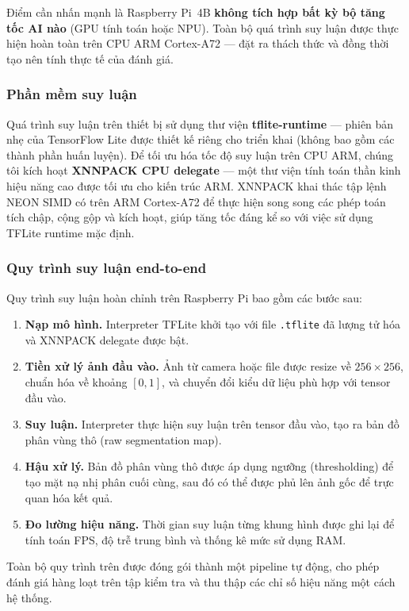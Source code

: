 \documentclass[conference]{IEEEtran}
\begin{document}
Điểm cần nhấn mạnh là Raspberry Pi~4B \textbf{không tích hợp bất kỳ bộ tăng tốc AI nào} (GPU tính toán hoặc NPU). Toàn bộ quá trình suy luận được thực hiện hoàn toàn trên CPU ARM Cortex-A72 --- đặt ra thách thức và đồng thời tạo nên tính thực tế của đánh giá.

\subsubsection{Phần mềm suy luận}

Quá trình suy luận trên thiết bị sử dụng thư viện \textbf{tflite-runtime} --- phiên bản nhẹ của TensorFlow Lite được thiết kế riêng cho triển khai (không bao gồm các thành phần huấn luyện). Để tối ưu hóa tốc độ suy luận trên CPU ARM, chúng tôi kích hoạt \textbf{XNNPACK CPU delegate} --- một thư viện tính toán thần kinh hiệu năng cao được tối ưu cho kiến trúc ARM. XNNPACK khai thác tập lệnh NEON SIMD có trên ARM Cortex-A72 để thực hiện song song các phép toán tích chập, cộng gộp và kích hoạt, giúp tăng tốc đáng kể so với việc sử dụng TFLite runtime mặc định.

\subsubsection{Quy trình suy luận end-to-end}

Quy trình suy luận hoàn chỉnh trên Raspberry Pi bao gồm các bước sau:
\begin{enumerate}
  \item \textbf{Nạp mô hình.} Interpreter TFLite khởi tạo với file \texttt{.tflite} đã lượng tử hóa và XNNPACK delegate được bật.
  \item \textbf{Tiền xử lý ảnh đầu vào.} Ảnh từ camera hoặc file được resize về $256 \times 256$, chuẩn hóa về khoảng $[0, 1]$, và chuyển đổi kiểu dữ liệu phù hợp với tensor đầu vào.
  \item \textbf{Suy luận.} Interpreter thực hiện suy luận trên tensor đầu vào, tạo ra bản đồ phân vùng thô (raw segmentation map).
  \item \textbf{Hậu xử lý.} Bản đồ phân vùng thô được áp dụng ngưỡng (thresholding) để tạo mặt nạ nhị phân cuối cùng, sau đó có thể được phủ lên ảnh gốc để trực quan hóa kết quả.
  \item \textbf{Đo lường hiệu năng.} Thời gian suy luận từng khung hình được ghi lại để tính toán FPS, độ trễ trung bình và thống kê mức sử dụng RAM.
\end{enumerate}

Toàn bộ quy trình trên được đóng gói thành một pipeline tự động, cho phép đánh giá hàng loạt trên tập kiểm tra và thu thập các chỉ số hiệu năng một cách hệ thống.
\end{document}
